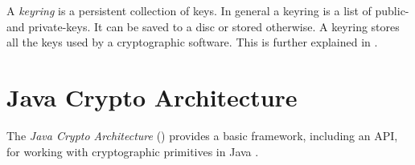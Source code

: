 A \textit{keyring} is a persistent collection of keys. 
In general a keyring is a list of public- and private-keys. It can be saved to a disc or stored otherwise. 
A keyring stores all the keys used by a cryptographic software.
This is further explained in \cite[section 3.6]{RFC4880}.





\section{Java Crypto Architecture} \label{section:pre:jca}

The \textit{Java Crypto Architecture} () provides a basic framework, including an API, for working with cryptographic primitives in Java \cite{JCA}.

